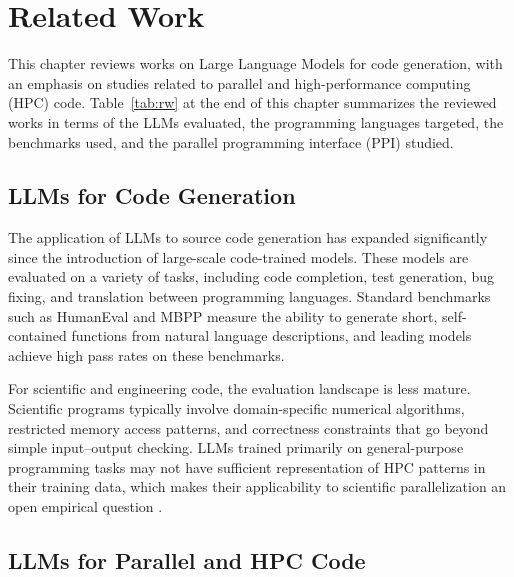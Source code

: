 \chapter{Related Work}\label{chapter:trabalhos}

This chapter reviews works on Large Language Models for code generation, with an emphasis on studies related to parallel and high-performance computing (HPC) code. 
Table~\ref{tab:rw} at the end of this chapter summarizes the reviewed works in terms of the LLMs evaluated, the programming languages targeted, the benchmarks used, and the parallel programming interface (PPI) studied.

\section{LLMs for Code Generation}
\label{sec:rw_codegen}

The application of LLMs to source code generation has expanded significantly since the introduction of large-scale code-trained models. These models are evaluated on a variety of tasks, including code completion, test generation, bug fixing, and translation between programming languages. Standard benchmarks such as HumanEval  and MBPP  measure the ability to generate short, self-contained functions from natural language descriptions, and leading models achieve high pass rates on these benchmarks.

For scientific and engineering code, the evaluation landscape is less mature. Scientific programs typically involve domain-specific numerical algorithms, restricted memory access patterns, and correctness constraints that go beyond simple input--output checking. LLMs trained primarily on general-purpose programming tasks may not have sufficient representation of HPC patterns in their training data, which makes their applicability to scientific parallelization an open empirical question .

\section{LLMs for Parallel and HPC Code}
\label{sec:rw_hpc}


